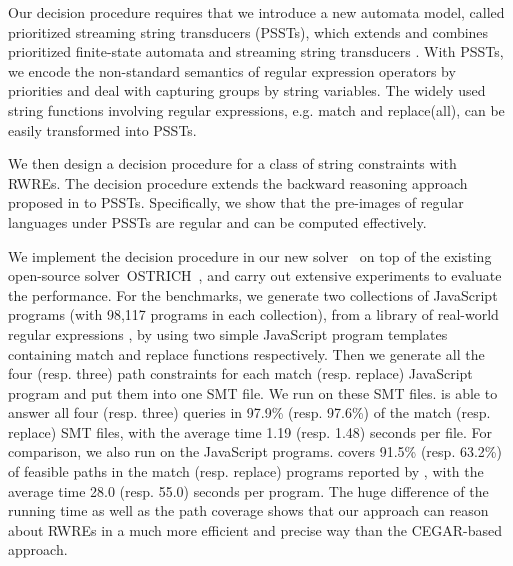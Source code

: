 {%
Our decision procedure requires that we introduce a new automata model, called 
prioritized streaming string transducers (PSSTs), which extends and combines 
prioritized finite-state automata \cite{BM17} and streaming string transducers 
\cite{AC10,AD11}. With PSSTs, we encode the non-standard semantics of regular 
expression operators by priorities and deal with capturing groups by string variables. 
The widely used string functions involving regular expressions, e.g. match and replace(all), can be easily transformed into PSSTs. 

We then design a decision procedure for a class of string constraints with RWREs. The decision procedure extends the backward reasoning approach proposed in \cite{CHL+19} to PSSTs. Specifically, we show that the pre-images of regular languages under PSSTs are regular and can be computed effectively. 

We implement the decision procedure in our new solver \ostrich\  
on top of the existing open-source solver~OSTRICH~\cite{CHL+19},
 and carry out extensive experiments to evaluate the performance. For the benchmarks, we generate two collections of JavaScript programs (with 98,117 programs in each collection), from a library of real-world regular expressions \cite{DMC+19}, by using two simple JavaScript program templates containing match and replace functions respectively.  
 Then we generate all the four (resp. three) path constraints for each match (resp. replace) JavaScript program and put them into one SMT file. We run {\ostrich} on these SMT files. {\ostrich} is able to answer all four (resp. three) queries in 97.9\% (resp. 97.6\%) of the match (resp. replace) SMT files, with the average time 1.19 (resp. 1.48) seconds per file. For comparison, we also run \expose{} on the JavaScript programs. \expose{} covers 91.5\% (resp. 63.2\%) of feasible paths in the match (resp. replace) programs reported by {\ostrich}, with  the average time 28.0 (resp. 55.0) seconds per program. The huge difference of the running time as well as the path coverage shows that our approach can reason about RWREs in a much more efficient and precise way than the CEGAR-based approach. 
 }



